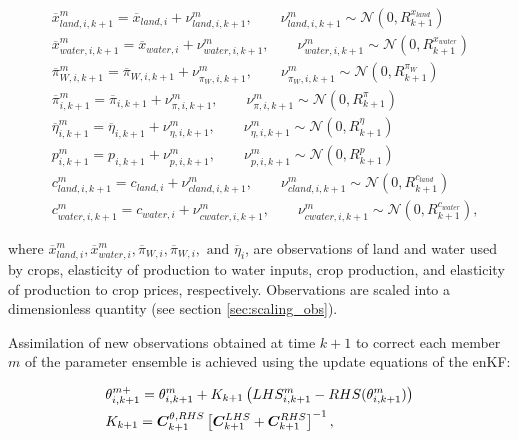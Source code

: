 \begin{equation}
    \begin{split}
        &\overline{x}_{land,i,k+1}^m = \overline{x}_{land,i} + \nu_{land,i,k+1}^m, \qquad  \nu_{land,i,k+1}^m \sim \mathcal{N}\left(0, R_{k+1}^{x_{land}} \right)\\
        &\overline{x}_{water,i,k+1}^m = \overline{x}_{water,i} + \nu_{water,i,k+1}^m, \qquad  \nu_{water,i,k+1}^m \sim \mathcal{N}\left(0, R_{k+1}^{x_{water}} \right)\\
        &\overline{\pi}_{W,i,k+1}^m = \overline{\pi}_{W,i,k+1} + \nu_{\pi_W,i,k+1}^m, \qquad  \nu_{\pi_W,i,k+1}^m \sim \mathcal{N}\left(0, R_{k+1}^{\pi_W} \right)\\
        &\overline{\pi}_{i,k+1}^m = \overline{\pi}_{i,k+1} + \nu_{\pi,i,k+1}^m, \qquad  \nu_{\pi,i,k+1}^m \sim \mathcal{N}\left(0, R_{k+1}^{\pi} \right)\\
        &\overline{\eta}_{i,k+1}^m = \overline{\eta}_{i,k+1} + \nu_{\eta,i,k+1}^m, \qquad  \nu_{\eta,i,k+1}^m \sim \mathcal{N}\left(0, R_{k+1}^{\eta} \right)\\
        &p_{i,k+1}^m = p_{i,k+1} + \nu_{p,i,k+1}^m, \qquad  \nu_{p,i,k+1}^m \sim \mathcal{N}\left(0, R_{k+1}^{p} \right)\\
        &c_{land,i,k+1}^m = c_{land,i} + \nu_{cland,i,k+1}^m, \qquad  \nu_{cland,i,k+1}^m \sim \mathcal{N}\left(0, R_{k+1}^{c_{land}} \right)\\
        &c_{water,i,k+1}^m = c_{water,i} + \nu_{cwater,i,k+1}^m, \qquad  \nu_{cwater,i,k+1}^m \sim \mathcal{N}\left(0, R_{k+1}^{c_{water}} \right),
    \end{split}
\end{equation}

\noindent where $\overline{x}_{land,i}^m, \overline{x}_{water,i}^m, \overline{\pi}_{W,i}, \overline{\pi}_{W,i}, \text{ and } \overline{\eta}_i $, are observations of land and water used by crops, elasticity of production to water inputs, crop production, and elasticity of production to crop prices, respectively. Observations are scaled into a dimensionless quantity (see section \ref{sec:scaling_obs}). 
    
Assimilation of new observations obtained at time $k+1$ to correct each member $m$ of the parameter ensemble is achieved using the update equations of the enKF:  

\begin{equation}\label{eq:recursive_bayes}
    \begin{split}
    &\theta_{i,k+1}^{m+} = \theta_{i,k+1}^{m} + K_{k+1} \left( LHS^m_{i,k+1} - RHS(\theta_{i,k+1}^{m})\right)\\
    &K_{k+1} = \bm{C}^{\theta,RHS}_{k+1} \left[\bm{C}^{LHS}_{k+1} + \bm{C}^{RHS}_{k+1}\right]^{-1},\\
    \end{split}
\end{equation}

